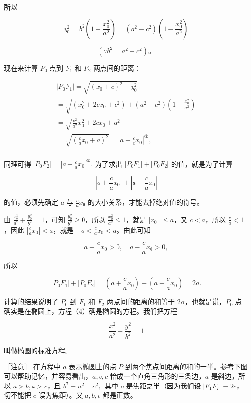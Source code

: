 所以

\[
y_{0} ^ {2} = b^{2} \left(1 - \frac {x_{0} ^ {2}}{a^{2}}\right) = (a^{2} - c^{2}) \left(1 - \frac {x_{0} ^ {2}}{a^{2}}\right)
\]

\[
(\because b^{2} = a^{2} - c^{2})\text{。}
\]

现在来计算 \(P_{0}\) 点到 \(F_{1}\) 和 \(F_{2}\) 两点间的距离：

\[
\begin{array}{l} \left| P_{0} F_{1} \right| = \sqrt {\left(x_{0} + c\right) ^ {2} + y_{0} ^ {2}} \\ = \sqrt {\left(x_{0} ^ {2} + 2 c x_{0} + c^{2}\right) + \left(a^{2} - c^{2}\right) \left(1 - \frac {x_{0} ^ {2}}{a^{2}}\right)} \\ = \sqrt {\frac {v^{2}}{a^{2}} x_{0} ^ {2} + 2 c x_{0} + a^{2}} \\ = \sqrt {\left(\frac {c}{a} x_{0} + a\right) ^ {2}} = \left| a + \frac {c}{a} x_{0} \right| ^ {①}, \\ \end{array}
\]

同理可得 \(|P_0F_2| = |a - \frac{c}{a} x_0|^{\text{②}}.\) 为了求出
\(|P_0F_1| + |P_0F_2|\) 的值，就是为了计算

\[
\left| a + \frac {c}{a} x_{0} \right| + \left| a - \frac {c}{a} x_{0} \right|
\]

的值，必须先确定 \(a\) 与 \(\frac{c}{a} x_0\)
的大小关系，才能去掉绝对值的符号。

由 \(\frac{x_0^2}{a^2} + \frac{y_0^2}{b^2} = 1\)，可知
\(\frac{y_0^2}{b^2} \geqslant 0\)，所以
\(\frac{x_0^2}{a^2} \leqslant 1\)，就是 \(|x_0|\) \(\leqslant a\)，又
\(c < a\)，所以 \(\frac{c}{a} < 1\)，因此
\(\left|\frac{c}{a} x_0\right| < a\)，就是
\(-a < \frac{c}{a} x_0 < a\)。由此可知

\[
a + \frac {c}{a} x_{0} > 0, \quad a - \frac {c}{a} x_{0} > 0,
\]

所以

\[
\left| P_{0} F_{1} \right| + \left| P_{0} F_{2} \right| = \left(a + \frac {c}{a} x_{0}\right) + \left(a - \frac {c}{a} x_{0}\right) = 2 a.
\]

计算的结果说明了 \(P_{0}\) 到 \(F_{1}\) 和 \(F_{2}\)
两点间的距离的和等于 \(2\alpha\)，也就是说，\(P_{0}\)
点确实是在椭圆上，方程（4）确是椭圆的方程。我们把方程

\[
\boxed {\frac {x^{2}}{a^{2}} + \frac {y^{2}}{b^{2}} = 1}
\]

叫做椭圆的标准方程。

［注意］ 在方程中 \(a\) 表示椭圆上的点 \(P\)
到两个焦点间距离的和的一半。参考下图可以帮助记忆，并容易看出，\(a, b, c\)
恰成一个直角三角形的三条边，\(a\) 是斜边，所以 \(a > b, a > c\)，且
\(b^2 = a^2 - c^2\)，其中 \(c\) 是焦距之半（因为我们设
\(|F_1F_2| = 2c\)，切不能把 \(c\) 误为焦距）。又 \(a, b, c\) 都是正数。

